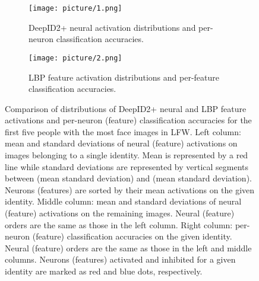 \documentclass[10pt,twocolumn,letterpaper]{article}
\begin{document}
\begin{figure}[tb!]

\begin{subfigure}{1.0\linewidth}
\texttt{[image: picture/1.png]}
\vspace{-0.2in}
\caption{DeepID2+ neural activation distributions and per-neuron classification accuracies.}
\label{fig:actcnn}
\vspace{0.05in}
\end{subfigure}

\begin{subfigure}{1.0\linewidth}
\texttt{[image: picture/2.png]}
\vspace{-0.2in}
\caption{LBP feature activation distributions and per-feature classification accuracies.}
\label{fig:actlbp}
\vspace{0.0in}
\end{subfigure}

\vspace{-0.05in}
\caption{Comparison of distributions of DeepID2+ neural and LBP feature activations and per-neuron (feature) classification accuracies for the first five people with the most face images in LFW. Left column: mean and standard deviations of neural (feature) activations on images belonging to a single identity. Mean is represented by a red line while standard deviations are represented by vertical segments between (mean  standard deviation) and (mean  standard deviation). Neurons (features) are sorted by their mean activations on the given identity. Middle column: mean and standard deviations of neural (feature) activations on the remaining images. Neural (feature) orders are the same as those in the left column. Right column: per-neuron (feature) classification accuracies on the given identity. Neural (feature) orders are the same as those in the left and middle columns. Neurons (features) activated and inhibited for a given identity are marked as red and blue dots, respectively.}
\vspace{-0.05in}
\label{fig:act}
\end{figure}
\end{document}
